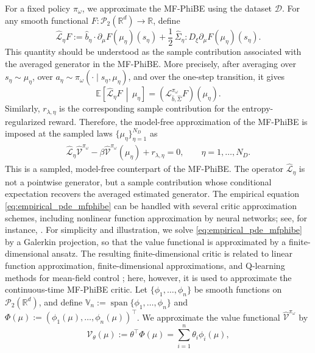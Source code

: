 \documentclass[a4paper, 10pt, english, reqno]{amsart}
\begin{document}
For a fixed policy $\pi_\omega$, we approximate the MF-PhiBE using the
dataset $\mathcal D$. For any smooth functional
$F:\mathcal P_2(\mathbb R^d)\to\mathbb R$, define
\[
  \widehat{\mathcal L}_\eta F
  :=
  \widehat b_\eta\cdot
  \partial_\mu F(\mu_\eta)(s_\eta)
  +
  \frac12\,\widehat\Sigma_\eta:
  D_\xi\partial_\mu F(\mu_\eta)(s_\eta).
\]
This quantity should be understood as the sample contribution associated
with the averaged generator in the MF-PhiBE. More precisely, after
averaging over $s_\eta\sim\mu_\eta$, over
$a_\eta\sim\pi_\omega(\cdot\mid s_\eta,\mu_\eta)$, and over the
one-step transition, it gives
\[
  \mathbb E\!\left[
    \widehat{\mathcal L}_\eta F
    \,\middle|\,
    \mu_\eta
  \right]
  =
  (\mathcal L_{\hat b,\hat\Sigma}^{\pi_\omega}F)(\mu_\eta).
\]
Similarly, $r_{\lambda,\eta}$ is the corresponding sample contribution
for the entropy-regularized reward. Therefore, the model-free approximation of the MF-PhiBE is imposed at
the sampled laws $\{\mu_\eta\}_{\eta=1}^{N_D}$ as
\begin{align}\label{eq:empirical_pde_mfphibe}
  \widehat{\mathcal L}_\eta \hat{\mathcal V}^{\pi_\omega}
  -
  \beta\hat{\mathcal V}^{\pi_\omega}(\mu_\eta)
  +
  r_{\lambda,\eta}
  =
  0,
  \qquad
  \eta=1,\dots,N_D.
\end{align}
This is a sampled, model-free counterpart of the MF-PhiBE. The operator $\widehat{\mathcal L}_\eta$ is not a pointwise generator, but a sample contribution whose conditional expectation recovers the averaged estimated generator. The empirical equation \eqref{eq:empirical_pde_mfphibe} can be handled with several critic approximation schemes, including nonlinear function approximation by neural networks; see, for instance, \cite{pham2025actor}. For simplicity and illustration, we solve \eqref{eq:empirical_pde_mfphibe} by a Galerkin projection, so that the value functional is approximated by a finite-dimensional ansatz. The resulting finite-dimensional critic is related to linear function approximation, finite-dimensional approximations, and Q-learning methods for mean-field control \cite{BayraktarKaraJMLR,BayraktarKaraBauerle}; here, however, it is used to approximate the continuous-time MF-PhiBE critic. Let
$\{\phi_1,\dots,\phi_n\}$ be smooth functions on
$\mathcal P_2(\mathbb R^d)$, and define
$\mathbb V_n:=\operatorname{span}\{\phi_1,\dots,\phi_n\}$ and
$\Phi(\mu):=(\phi_1(\mu),\dots,\phi_n(\mu))^\top$. We approximate the
value functional $\hat{\mathcal V}^{\pi_\omega}$ by
\begin{equation}\label{eq:critic-linear-ansatz-mkv}
  \mathcal V_\theta(\mu)
  :=
  \theta^\top\Phi(\mu)
  =
  \sum_{i=1}^n\theta_i\phi_i(\mu),
\end{equation}
\end{document}
